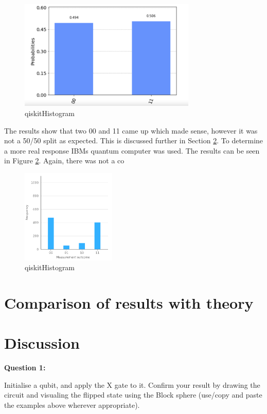\begin{figure}[h]
    \centering
    \includegraphics[width=0.75\textwidth]{lab2/images/qiskitHistogram.png}
    \caption{qiskitHistogram} 
    \label{fig:qiskitHistogram}
\end{figure} 

The results show that two 00 and 11 came up which made sense,  however it was not a 50/50 split as expected. This is discussed further in Section \ref{sec:discussion}. To determine a more real response IBMs quantum computer was used. The results can be seen in Figure \ref{fig:ibmHistogram}. Again, there was not a co

\begin{figure}[h]
    \centering
    \includegraphics[width=0.4\textwidth]{lab2/images/ibmHistogram.png}
    \caption{qiskitHistogram} 
    \label{fig:ibmHistogram}
\end{figure} 

\section{Comparison of results with theory}
\section{Discussion} \label{sec:discussion}
\textbf{Question 1:}

Initialise a qubit, and apply the X gate to it. Confirm your result by drawing the circuit and visualing the flipped state using the Block sphere (use/copy and paste the examples above wherever appropriate).


